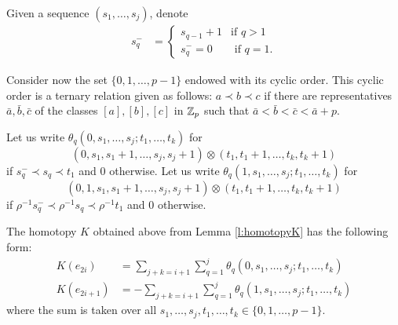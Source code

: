 \begin{definition}
	Given a sequence $(s_1,\ldots,s_j)$, denote
	\begin{align*}
		s_q^- &= \begin{cases}s_{q-1}+1 & \text{if $q>1$}\\
			s_q^- = 0 & \text{ if $q=1$.}
		\end{cases}
	\end{align*}
\end{definition}

Consider now the set $\{0,1,\dots,p-1\}$ endowed with its cyclic order. This cyclic order is a ternary relation given as follows: $a\prec b\prec c$
if there are representatives $\bar{a},\bar{b},\bar{c}$ of the classes $[a],[b],[c]$ in $\mathbb{Z}_p$ such that $\bar{a}<\bar{b}<\bar{c}<\bar{a}+p$.

\begin{definition}
	Let us write $\theta_q(0,s_1,\ldots,s_j;t_1,\ldots,t_k)$ for
	\[(0,s_1,s_1+1,\ldots,s_j,s_j+1)\otimes (t_1,t_1+1,\ldots,t_k,t_k+1)\]
	if $s_q^-\prec s_q\prec t_1$ and $0$ otherwise. Let us write $\theta_q(1,s_1,\ldots,s_j;t_1,\ldots,t_k)$ for
	\[(0,1,s_1,s_1+1,\ldots,s_j,s_j+1)\otimes (t_1,t_1+1,\ldots,t_k,t_k+1)\]
	if $\rho^{-1} s_q^-\prec \rho^{-1} s_q\prec \rho^{-1} t_1$ and $0$ otherwise.
\end{definition}

\begin{lemma}\label{l:homotopyK'}
	The homotopy $K$ obtained above from Lemma \ref{l:homotopyK} has the following form:
	\begin{align} \label{eq:homotopyK'1}
		K(e_{2i}) &= \sum_{j+k = i+1}{\sum_{q=1}^j{\theta_q(0,s_1,\ldots,s_j;t_1,\ldots,t_k)}} \\ \label{eq:homotopyK'2}
		K(e_{2i+1}) &= -\sum_{j+k = i+1}{\sum_{q=1}^j{\theta_q(1,s_1,\ldots,s_j;t_1,\ldots,t_k)}}
	\end{align}
	where the sum is taken over all $s_1,\ldots,s_j,t_1,\ldots,t_k\in \{0,1,\ldots,p-1\}$.
\end{lemma}

